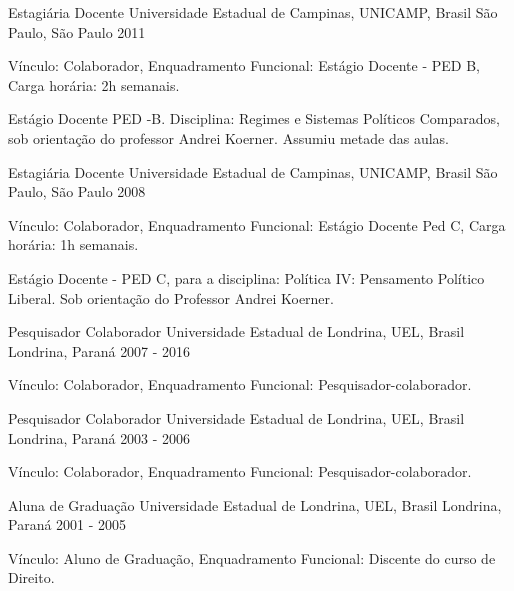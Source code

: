 \begin{cventries}
\cventry
{Estagiária Docente}
{Universidade Estadual de Campinas, UNICAMP, Brasil}
{São Paulo, São Paulo}
{2011}
{
\begin{cvitems}
  \item Vínculo: Colaborador, Enquadramento Funcional: Estágio Docente - PED B, Carga horária: 2h semanais.
  \item Estágio Docente PED -B. Disciplina: Regimes e Sistemas Políticos Comparados, sob orientação do professor Andrei Koerner. Assumiu metade das aulas.
\end{cvitems}
}

\cventry
{Estagiária Docente}
{Universidade Estadual de Campinas, UNICAMP, Brasil}
{São Paulo, São Paulo}
{2008}
{
\begin{cvitems}
  \item Vínculo: Colaborador, Enquadramento Funcional: Estágio Docente Ped C, Carga horária: 1h semanais.
  \item Estágio Docente - PED C, para a disciplina: Política IV: Pensamento Político Liberal. Sob orientação do Professor Andrei Koerner.
\end{cvitems}
}

\cventry
{Pesquisador Colaborador}
{Universidade Estadual de Londrina, UEL, Brasil}
{Londrina, Paraná}
{2007 - 2016}
{
\begin{cvitems}
  \item Vínculo: Colaborador, Enquadramento Funcional: Pesquisador-colaborador.
\end{cvitems}
}

\cventry
{Pesquisador Colaborador}
{Universidade Estadual de Londrina, UEL, Brasil}
{Londrina, Paraná}
{2003 - 2006}
{
\begin{cvitems}
  \item Vínculo: Colaborador, Enquadramento Funcional: Pesquisador-colaborador.
\end{cvitems}
}

\cventry
{Aluna de Graduação}
{Universidade Estadual de Londrina, UEL, Brasil}
{Londrina, Paraná}
{2001 - 2005}
{
\begin{cvitems}
  \item Vínculo: Aluno de Graduação, Enquadramento Funcional: Discente do curso de Direito.
\end{cvitems}
}

\end{cventries}
